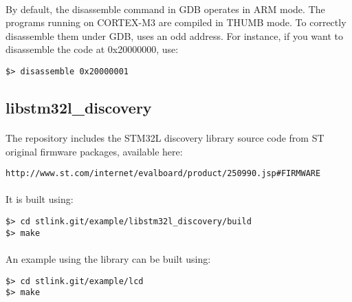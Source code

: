 \documentclass[a4paper, 11pt]{article}
\begin{document}
\paragraph{}
By default, the disassemble command in GDB operates in ARM mode. The programs running on CORTEX-M3
are compiled in THUMB mode. To correctly disassemble them under GDB, uses an odd address. For instance,
if you want to disassemble the code at 0x20000000, use:\\
\begin{small}
\begin{lstlisting}[frame=tb]
$> disassemble 0x20000001
\end{lstlisting}
\end{small}


\subsection{libstm32l\_discovery}
\paragraph{}
The repository includes the STM32L discovery library source code from ST original firmware packages,
available here:\\
\begin{small}
\begin{lstlisting}[frame=tb]
http://www.st.com/internet/evalboard/product/250990.jsp#FIRMWARE
\end{lstlisting}
\end{small}

\paragraph{}
It is built using:\\
\begin{small}
\begin{lstlisting}[frame=tb]
$> cd stlink.git/example/libstm32l_discovery/build
$> make
\end{lstlisting}
\end{small}

\paragraph{}
An example using the library can be built using:\\
\begin{small}
\begin{lstlisting}[frame=tb]
$> cd stlink.git/example/lcd
$> make
\end{lstlisting}
\end{small}
\end{document}
